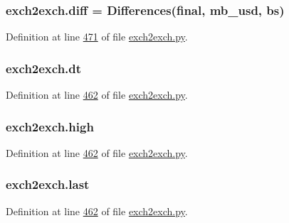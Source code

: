 \subsubsection[{\texorpdfstring{diff}{diff}}]{\setlength{\rightskip}{0pt plus 5cm}exch2exch.\+diff = {\bf Differences}(final, mb\+\_\+usd, {\bf bs})}\hypertarget{namespaceexch2exch_a588ff4447b7d1ff41ea1d80c3d59005a}{}\label{namespaceexch2exch_a588ff4447b7d1ff41ea1d80c3d59005a}


Definition at line \hyperlink{exch2exch_8py_source_l00471}{471} of file \hyperlink{exch2exch_8py_source}{exch2exch.\+py}.

\subsubsection[{\texorpdfstring{dt}{dt}}]{\setlength{\rightskip}{0pt plus 5cm}exch2exch.\+dt}\hypertarget{namespaceexch2exch_ab2b0f5888343e46aef72751a4be48b71}{}\label{namespaceexch2exch_ab2b0f5888343e46aef72751a4be48b71}


Definition at line \hyperlink{exch2exch_8py_source_l00462}{462} of file \hyperlink{exch2exch_8py_source}{exch2exch.\+py}.

\subsubsection[{\texorpdfstring{high}{high}}]{\setlength{\rightskip}{0pt plus 5cm}exch2exch.\+high}\hypertarget{namespaceexch2exch_ace0a1a9df842ce16d0f0d7da40f6c1a4}{}\label{namespaceexch2exch_ace0a1a9df842ce16d0f0d7da40f6c1a4}


Definition at line \hyperlink{exch2exch_8py_source_l00462}{462} of file \hyperlink{exch2exch_8py_source}{exch2exch.\+py}.

\subsubsection[{\texorpdfstring{last}{last}}]{\setlength{\rightskip}{0pt plus 5cm}exch2exch.\+last}\hypertarget{namespaceexch2exch_add3246fb611f3a6c35f10498f21c10ba}{}\label{namespaceexch2exch_add3246fb611f3a6c35f10498f21c10ba}


Definition at line \hyperlink{exch2exch_8py_source_l00462}{462} of file \hyperlink{exch2exch_8py_source}{exch2exch.\+py}.

